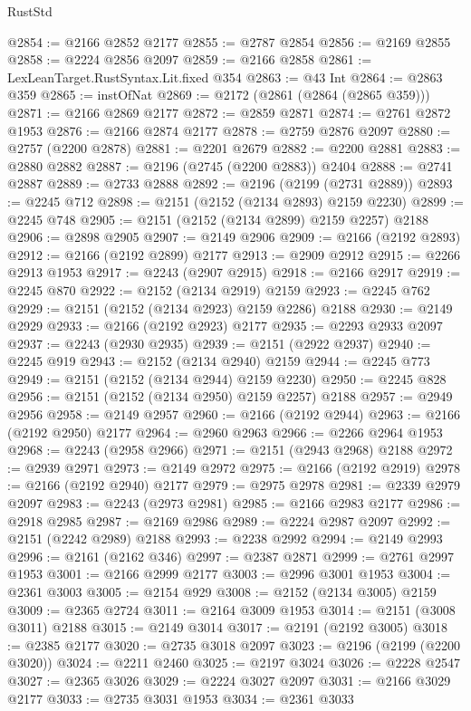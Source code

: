 \begin{lexlean}{RustStd}
\begin{coremodule}
@2854 := @2166 @2852 @2177
@2855 := @2787 @2854
@2856 := @2169 @2855
@2858 := @2224 @2856 @2097
@2859 := @2166 @2858
@2861 := LexLeanTarget.RustSyntax.Lit.fixed @354
@2863 := @43 Int
@2864 := @2863 @359
@2865 := instOfNat
@2869 := @2172 (@2861 (@2864 (@2865 @359)))
@2871 := @2166 @2869 @2177
@2872 := @2859 @2871
@2874 := @2761 @2872 @1953
@2876 := @2166 @2874 @2177
@2878 := @2759 @2876 @2097
@2880 := @2757 (@2200 @2878)
@2881 := @2201 @2679
@2882 := @2200 @2881
@2883 := @2880 @2882
@2887 := @2196 (@2745 (@2200 @2883)) @2404
@2888 := @2741 @2887
@2889 := @2733 @2888
@2892 := @2196 (@2199 (@2731 @2889))
@2893 := @2245 @712
@2898 := @2151 (@2152 (@2134 @2893) @2159 @2230)
@2899 := @2245 @748
@2905 := @2151 (@2152 (@2134 @2899) @2159 @2257) @2188
@2906 := @2898 @2905
@2907 := @2149 @2906
@2909 := @2166 (@2192 @2893)
@2912 := @2166 (@2192 @2899) @2177
@2913 := @2909 @2912
@2915 := @2266 @2913 @1953
@2917 := @2243 (@2907 @2915)
@2918 := @2166 @2917
@2919 := @2245 @870
@2922 := @2152 (@2134 @2919) @2159
@2923 := @2245 @762
@2929 := @2151 (@2152 (@2134 @2923) @2159 @2286) @2188
@2930 := @2149 @2929
@2933 := @2166 (@2192 @2923) @2177
@2935 := @2293 @2933 @2097
@2937 := @2243 (@2930 @2935)
@2939 := @2151 (@2922 @2937)
@2940 := @2245 @919
@2943 := @2152 (@2134 @2940) @2159
@2944 := @2245 @773
@2949 := @2151 (@2152 (@2134 @2944) @2159 @2230)
@2950 := @2245 @828
@2956 := @2151 (@2152 (@2134 @2950) @2159 @2257) @2188
@2957 := @2949 @2956
@2958 := @2149 @2957
@2960 := @2166 (@2192 @2944)
@2963 := @2166 (@2192 @2950) @2177
@2964 := @2960 @2963
@2966 := @2266 @2964 @1953
@2968 := @2243 (@2958 @2966)
@2971 := @2151 (@2943 @2968) @2188
@2972 := @2939 @2971
@2973 := @2149 @2972
@2975 := @2166 (@2192 @2919)
@2978 := @2166 (@2192 @2940) @2177
@2979 := @2975 @2978
@2981 := @2339 @2979 @2097
@2983 := @2243 (@2973 @2981)
@2985 := @2166 @2983 @2177
@2986 := @2918 @2985
@2987 := @2169 @2986
@2989 := @2224 @2987 @2097
@2992 := @2151 (@2242 @2989) @2188
@2993 := @2238 @2992
@2994 := @2149 @2993
@2996 := @2161 (@2162 @346)
@2997 := @2387 @2871
@2999 := @2761 @2997 @1953
@3001 := @2166 @2999 @2177
@3003 := @2996 @3001 @1953
@3004 := @2361 @3003
@3005 := @2154 @929
@3008 := @2152 (@2134 @3005) @2159
@3009 := @2365 @2724
@3011 := @2164 @3009 @1953
@3014 := @2151 (@3008 @3011) @2188
@3015 := @2149 @3014
@3017 := @2191 (@2192 @3005)
@3018 := @2385 @2177
@3020 := @2735 @3018 @2097
@3023 := @2196 (@2199 (@2200 @3020))
@3024 := @2211 @2460
@3025 := @2197 @3024
@3026 := @2228 @2547
@3027 := @2365 @3026
@3029 := @2224 @3027 @2097
@3031 := @2166 @3029 @2177
@3033 := @2735 @3031 @1953
@3034 := @2361 @3033

\end{coremodule}
\end{lexlean}
